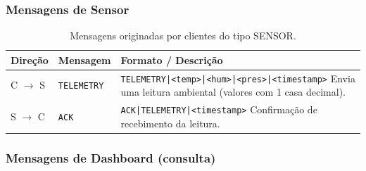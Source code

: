 \documentclass[12pt, a4paper]{article}
\begin{document}
\subsubsection{Mensagens de Sensor}

\begin{table}[H]
\centering
\caption{Mensagens originadas por clientes do tipo SENSOR.}
\label{tab:sensor-msgs}
\begin{tabularx}{\linewidth}{llX}
\toprule
\textbf{Direção} & \textbf{Mensagem} & \textbf{Formato / Descrição} \\
\midrule
C $\to$ S & \texttt{TELEMETRY} & \texttt{TELEMETRY|<temp>|<hum>|<pres>|<timestamp>} \newline Envia uma leitura ambiental (valores com 1 casa decimal). \\
\addlinespace
S $\to$ C & \texttt{ACK}       & \texttt{ACK|TELEMETRY|<timestamp>} \newline Confirmação de recebimento da leitura. \\
\bottomrule
\end{tabularx}
\end{table}

\subsubsection{Mensagens de Dashboard (consulta)}
\end{document}
